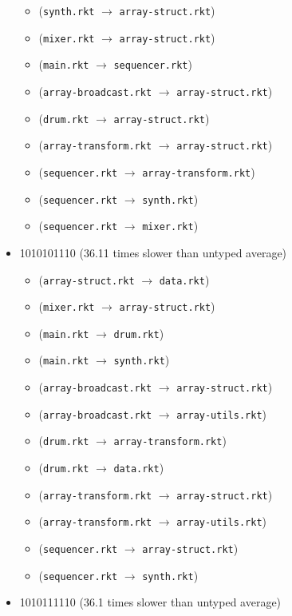 \documentclass{article}
\newcommand{\mono}[1]{\texttt{#1}}
\begin{document}
\begin{itemize}
\begin{itemize}
  \item (\mono{synth.rkt} $\rightarrow$ \mono{array-struct.rkt})
  \item (\mono{mixer.rkt} $\rightarrow$ \mono{array-struct.rkt})
  \item (\mono{main.rkt} $\rightarrow$ \mono{sequencer.rkt})
  \item (\mono{array-broadcast.rkt} $\rightarrow$ \mono{array-struct.rkt})
  \item (\mono{drum.rkt} $\rightarrow$ \mono{array-struct.rkt})
  \item (\mono{array-transform.rkt} $\rightarrow$ \mono{array-struct.rkt})
  \item (\mono{sequencer.rkt} $\rightarrow$ \mono{array-transform.rkt})
  \item (\mono{sequencer.rkt} $\rightarrow$ \mono{synth.rkt})
  \item (\mono{sequencer.rkt} $\rightarrow$ \mono{mixer.rkt})
  \end{itemize}
\item 1010101110 (36.11 times slower than untyped average)
  \begin{itemize}
  \item (\mono{array-struct.rkt} $\rightarrow$ \mono{data.rkt})
  \item (\mono{mixer.rkt} $\rightarrow$ \mono{array-struct.rkt})
  \item (\mono{main.rkt} $\rightarrow$ \mono{drum.rkt})
  \item (\mono{main.rkt} $\rightarrow$ \mono{synth.rkt})
  \item (\mono{array-broadcast.rkt} $\rightarrow$ \mono{array-struct.rkt})
  \item (\mono{array-broadcast.rkt} $\rightarrow$ \mono{array-utils.rkt})
  \item (\mono{drum.rkt} $\rightarrow$ \mono{array-transform.rkt})
  \item (\mono{drum.rkt} $\rightarrow$ \mono{data.rkt})
  \item (\mono{array-transform.rkt} $\rightarrow$ \mono{array-struct.rkt})
  \item (\mono{array-transform.rkt} $\rightarrow$ \mono{array-utils.rkt})
  \item (\mono{sequencer.rkt} $\rightarrow$ \mono{array-struct.rkt})
  \item (\mono{sequencer.rkt} $\rightarrow$ \mono{synth.rkt})
  \end{itemize}
\item 1010111110 (36.1 times slower than untyped average)

\end{itemize}
\end{document}
